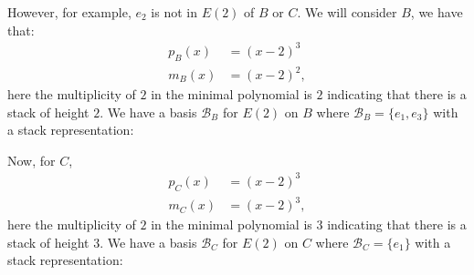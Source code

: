 \documentclass[a4paper, 12pt, twoside]{article}
\begin{document}
However, for example, $e_2$ is not in $E(2)$ of $B$ or $C$. We will consider $B$, we have that:
\begin{align*}
    p_B(x) &= (x - 2)^3 \\
    m_B(x) &= (x - 2)^2,
\end{align*} here the multiplicity of $2$ in the minimal polynomial is $2$ indicating
that there is a stack of height $2$. We have a basis $\mathcal{B}_B$ for $E(2)$ on $B$
where $\mathcal{B}_B = \{e_1, e_3\}$ with a stack representation: \begin{center}
\end{center} Now, for $C$, \begin{align*}
    p_C(x) &= (x - 2)^3 \\
    m_C(x) &= (x - 2)^3,
\end{align*} here the multiplicity of $2$ in the minimal polynomial is $3$ indicating
that there is a stack of height $3$. We have a basis $\mathcal{B}_C$ for $E(2)$ on $C$
where $\mathcal{B}_C = \{e_1\}$ with a stack representation: \begin{center}
\end{center}
\end{document}
